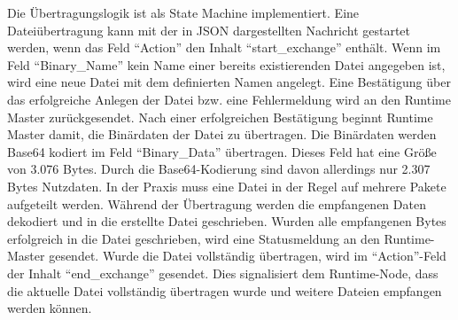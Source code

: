 Die Übertragungslogik ist als State Machine implementiert. Eine Dateiübertragung kann mit der in JSON dargestellten Nachricht gestartet werden, wenn das Feld \enquote{Action} den Inhalt \enquote{start\_exchange} enthält. Wenn im Feld \enquote{Binary\_Name} kein Name einer bereits existierenden Datei angegeben ist, wird eine neue Datei mit dem definierten Namen angelegt. Eine Bestätigung über das erfolgreiche Anlegen der Datei bzw. eine Fehlermeldung wird an den Runtime Master zurückgesendet. Nach einer erfolgreichen Bestätigung beginnt Runtime Master damit, die Binärdaten der Datei zu übertragen. Die Binärdaten werden Base64 kodiert im Feld \enquote{Binary\_Data} übertragen. Dieses Feld hat eine Größe von 3.076 Bytes. Durch die Base64-Kodierung sind davon allerdings nur 2.307 Bytes Nutzdaten. In der Praxis muss eine Datei in der Regel auf mehrere Pakete aufgeteilt werden. Während der Übertragung werden die empfangenen Daten dekodiert und in die erstellte Datei geschrieben. Wurden alle empfangenen Bytes erfolgreich in die Datei geschrieben, wird eine Statusmeldung an den Runtime-Master gesendet. Wurde die Datei vollständig übertragen, wird im \enquote{Action}-Feld der Inhalt \enquote{end\_exchange} gesendet. Dies signalisiert dem Runtime-Node, dass die aktuelle Datei vollständig übertragen wurde und weitere Dateien empfangen werden können.